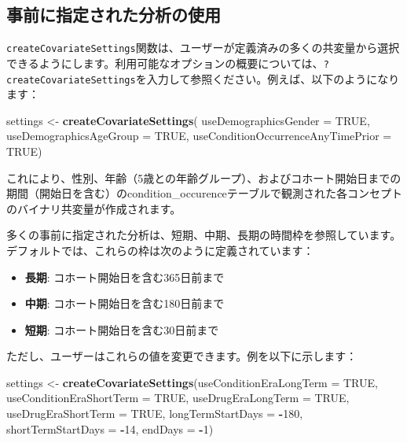 \documentclass[
  11pt]{book}
\newenvironment{Shaded}{\begin{snugshade}}{\end{snugshade}}
\newcommand{\AttributeTok}[1]{\textcolor[rgb]{0.13,0.29,0.53}{#1}}
\newcommand{\ConstantTok}[1]{\textcolor[rgb]{0.56,0.35,0.01}{#1}}
\newcommand{\DecValTok}[1]{\textcolor[rgb]{0.00,0.00,0.81}{#1}}
\newcommand{\FunctionTok}[1]{\textcolor[rgb]{0.13,0.29,0.53}{\textbf{#1}}}
\newcommand{\NormalTok}[1]{#1}
\newcommand{\OtherTok}[1]{\textcolor[rgb]{0.56,0.35,0.01}{#1}}
\newcommand{\SpecialCharTok}[1]{\textcolor[rgb]{0.81,0.36,0.00}{\textbf{#1}}}
\providecommand{\tightlist}{%
  \setlength{\itemsep}{0pt}\setlength{\parskip}{0pt}}
\theoremstyle{definition}
\theoremstyle{definition}
\theoremstyle{definition}
\theoremstyle{definition}
\theoremstyle{remark}
\begin{document}
\subsection{事前に指定された分析の使用}\label{ux4e8bux524dux306bux6307ux5b9aux3055ux308cux305fux5206ux6790ux306eux4f7fux7528}

\texttt{createCovariateSettings}関数は、ユーザーが定義済みの多くの共変量から選択できるようにします。利用可能なオプションの概要については、\texttt{?createCovariateSettings}を入力して参照ください。例えば、以下のようになります：

\begin{Shaded}
\begin{Highlighting}[]
\NormalTok{settings }\OtherTok{\textless{}{-}} \FunctionTok{createCovariateSettings}\NormalTok{(}
  \AttributeTok{useDemographicsGender =} \ConstantTok{TRUE}\NormalTok{,}
  \AttributeTok{useDemographicsAgeGroup =} \ConstantTok{TRUE}\NormalTok{,}
  \AttributeTok{useConditionOccurrenceAnyTimePrior =} \ConstantTok{TRUE}\NormalTok{)}
\end{Highlighting}
\end{Shaded}

これにより、性別、年齢（5歳との年齢グループ）、およびコホート開始日までの期間（開始日を含む）のcondition\_occurenceテーブルで観測された各コンセプトのバイナリ共変量が作成されます。

多くの事前に指定された分析は、短期、中期、長期の時間枠を参照しています。デフォルトでは、これらの枠は次のように定義されています：

\begin{itemize}
\tightlist
\item
  \textbf{長期}: コホート開始日を含む365日前まで
\item
  \textbf{中期}: コホート開始日を含む180日前まで
\item
  \textbf{短期}: コホート開始日を含む30日前まで
\end{itemize}

ただし、ユーザーはこれらの値を変更できます。例を以下に示します：

\begin{Shaded}
\begin{Highlighting}[]
\NormalTok{settings }\OtherTok{\textless{}{-}} \FunctionTok{createCovariateSettings}\NormalTok{(}\AttributeTok{useConditionEraLongTerm =} \ConstantTok{TRUE}\NormalTok{,}
                                    \AttributeTok{useConditionEraShortTerm =} \ConstantTok{TRUE}\NormalTok{,}
                                    \AttributeTok{useDrugEraLongTerm =} \ConstantTok{TRUE}\NormalTok{,}
                                    \AttributeTok{useDrugEraShortTerm =} \ConstantTok{TRUE}\NormalTok{,}
                                    \AttributeTok{longTermStartDays =} \SpecialCharTok{{-}}\DecValTok{180}\NormalTok{,}
                                    \AttributeTok{shortTermStartDays =} \SpecialCharTok{{-}}\DecValTok{14}\NormalTok{,}
                                    \AttributeTok{endDays =} \SpecialCharTok{{-}}\DecValTok{1}\NormalTok{)}
\end{Highlighting}
\end{Shaded}
\end{document}
